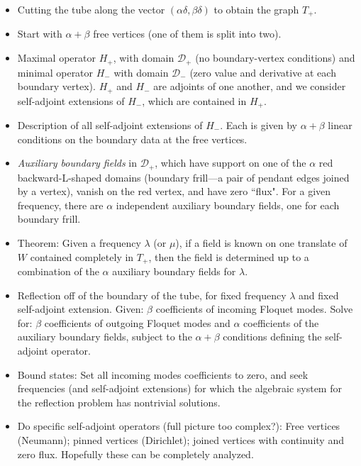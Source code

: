 \documentclass[12pt]{article}
\newcommand{\Dmax}{\mathcal{D}_+}
\newcommand{\Dmin}{\mathcal{D}_-}
\begin{document}
\begin{itemize}
\item Cutting the tube along the vector $(\alpha\delta,\beta\delta)$ to obtain the graph $T_+$.

\item Start with $\alpha+\beta$ free vertices (one of them is split into two).

\item Maximal operator $H_+$, with domain $\Dmax$ (no boundary-vertex conditions) and minimal operator $H_-$ with domain $\Dmin$ (zero value and derivative at each boundary vertex).  $H_+$ and $H_-$ are adjoints of one another, and we consider self-adjoint extensions of $H_-$, which are contained in $H_+$.

\item Description of all self-adjoint extensions of $H_-$.  Each is given by $\alpha+\beta$ linear conditions on the boundary data at the free vertices.

\item {\em Auxiliary boundary fields} in $\Dmax$, which have support on one of the $\alpha$ red backward-L-shaped domains (boundary frill---a pair of pendant edges joined by a vertex), vanish on the red vertex, and have zero ``flux".  For a given frequency, there are $\alpha$ independent auxiliary boundary fields, one for each boundary frill.

\item Theorem: Given a frequency $\lambda$ (or $\mu$), if a field is known on one translate of $W$ contained completely in $T_+$, then the field is determined up to a combination of the $\alpha$ auxiliary boundary fields for $\lambda$.

\item Reflection off of the boundary of the tube, for fixed frequency $\lambda$ and fixed self-adjoint extension.  Given: $\beta$ coefficients of incoming Floquet modes.  Solve for:  $\beta$ coefficients of outgoing Floquet modes and $\alpha$ coefficients of the auxiliary boundary fields, subject to the $\alpha+\beta$ conditions defining the self-adjoint operator.

\item Bound states:  Set all incoming modes coefficients to zero, and seek frequencies (and self-adjoint extensions) for which the algebraic system for the reflection problem has nontrivial solutions.

\item Do specific self-adjoint operators (full picture too complex?):  Free vertices (Neumann); pinned vertices (Dirichlet); joined vertices with continuity and zero flux.  Hopefully these can be completely analyzed.

\end{itemize}
\end{document}
